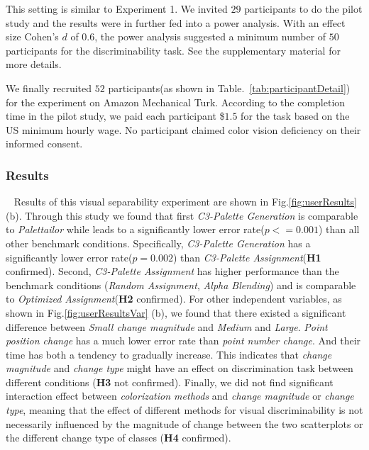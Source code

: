 \vspace{.3em}
This setting is similar to Experiment 1. We invited $29$ participants to do the pilot study and the results were in further fed into a power analysis. With an effect size Cohen's $d$ of $0.6$, the power analysis suggested a minimum number of $50$ participants for the discriminability task. See the supplementary material for more details.

\vspace{.3em}
We finally recruited $52$ participants(as shown in Table.~\ref{tab:participantDetail}) for the experiment on Amazon Mechanical Turk.
According to the completion time in the pilot study, we paid each participant \$$1.5$ for the task based on the US minimum hourly wage.
No participant claimed color vision deficiency on their informed consent.

\subsubsection{Results}
\
\newline
Results of this visual separability experiment are shown in Fig.\ref{fig:userResults} (b).
Through this study we found that first \emph{C3-Palette Generation} is comparable to \emph{Palettailor} while leads to a significantly lower error rate(\emph{$p<=0.001$}) than all other benchmark conditions. Specifically, \emph{C3-Palette Generation} has a significantly lower error rate(\emph{$p=0.002$}) than \emph{C3-Palette Assignment}(\textbf{H1} confirmed).
Second, \emph{C3-Palette Assignment} has higher performance than the benchmark conditions (\emph{Random Assignment}, \emph{Alpha Blending}) and is comparable to \emph{Optimized Assignment}(\textbf{H2} confirmed).
For other independent variables, as shown in Fig.\ref{fig:userResultsVar} (b), we found that there existed a significant difference between \emph{Small change magnitude} and \emph{Medium} and \emph{Large}. \emph{Point position change} has a much lower error rate than \emph{point number change}. And their time has both a tendency to gradually increase. This indicates that \emph{change magnitude} and \emph{change type} might have an effect on discrimination task between different conditions (\textbf{H3} not confirmed).
Finally, we did not find significant interaction effect between \emph{colorization methods} and \emph{change magnitude} or \emph{change type}, meaning that the effect of different methods for visual discriminability is not
necessarily influenced by the magnitude of change between the two scatterplots or the different change type of classes (\textbf{H4} confirmed).

